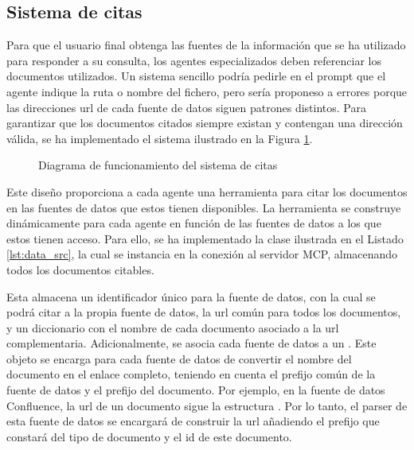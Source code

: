 \subsection{Sistema de citas}
Para que el usuario final obtenga las fuentes de la información que se ha utilizado para responder a su consulta, los agentes especializados deben referenciar los documentos utilizados. Un sistema sencillo podría pedirle en el prompt que el agente indique la ruta o nombre del fichero, pero sería proponeso a errores porque las direcciones url de cada fuente de datos siguen patrones distintos. Para garantizar que los documentos citados siempre existan y contengan una dirección válida, se ha implementado el sistema ilustrado en la Figura \ref{fig:citations}.

\begin{figure}[h]
  \centering
  \caption{Diagrama de funcionamiento del sistema de citas}
  \label{fig:citations}
\end{figure}


Este diseño proporciona a cada agente una herramienta para citar los documentos en las fuentes de datos que estos tienen disponibles. La herramienta se construye dinámicamente para cada agente en función de las fuentes de datos a los que estos tienen acceso. Para ello, se ha implementado la clase  ilustrada en el Listado \ref{lst:data_src}, la cual se instancia en la conexión al servidor MCP, almacenando todos los documentos citables. 

Esta almacena un identificador único para la fuente de datos, con la cual se podrá citar a la propia fuente de datos, la url común para todos los documentos, y un diccionario con el nombre de cada documento asociado a la url complementaria. Adicionalmente, se asocia cada fuente de datos a un . Este objeto se encarga para cada fuente de datos de convertir el nombre del documento en el enlace completo, teniendo en cuenta el prefijo común de la fuente de datos y el prefijo del documento. Por ejemplo, en la fuente de datos Confluence, la url de un documento sigue la estructura . Por lo tanto, el parser de esta fuente de datos se encargará de construir la url añadiendo el prefijo que constará del tipo de documento y el id de este documento. 

